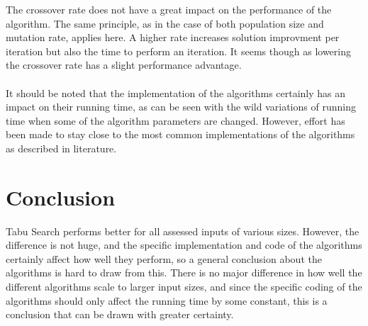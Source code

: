 \documentclass[titlepage,a4paper]{article}
\begin{document}
The crossover rate does not have a great impact on the performance of the algorithm. The same principle, as in the case of both population size and mutation rate, applies here. A higher rate increases solution improvment per iteration but also the time to perform an iteration. It seems though as lowering the crossover rate has a slight performance advantage.\\\\
It should be noted that the implementation of the algorithms certainly has an impact on their running time, as can be seen with the wild variations of running time when some of the algorithm parameters are changed. However, effort has been made to stay close to the most common implementations of the algorithms as described in literature.

\pagebreak
\section{Conclusion}
Tabu Search performs better for all assessed inputs of various sizes. However, the difference is not huge, and the specific implementation and code of the algorithms certainly affect how well they perform, so a general conclusion about the algorithms is hard to draw from this. There is no major difference in how well the different algorithms scale to larger input sizes, and since the specific coding of the algorithms should only affect the running time by some constant, this is a conclusion that can be drawn with greater certainty.

\pagebreak



\end{document}
